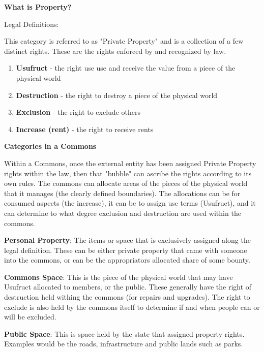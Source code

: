\documentclass{article}
\begin{document}
\pagebreak
{\huge \textbf{What is Property?}}
{\fontsize{9pt}{9pt}\selectfont
\large Legal Definitions:

This category is referred to as "Private Property" and is a collection of a few distinct rights. These are the rights enforced by and recognized by law. 

\begin{enumerate}
	
	\item \textbf{Usufruct} - the right use use and receive the value from a piece of the physical world

	\item \textbf{Destruction} - the right to destroy a piece of the physical world

	\item \textbf{Exclusion} -  the right to exclude others
 
	\item \textbf{Increase (rent)} - the right to receive rents
\end{enumerate}
	

\large \textbf{Categories in a Commons}

Within a Commons, once the external entity has been assigned Private Property rights within the law, then that "bubble" can ascribe the rights according to its own rules. The commons can allocate areas of the pieces of the physical world that it manages (the clearly defined boundaries). The allocations can be for consumed aspects (the increase), it can be to assign use terms (Usufruct), and it can determine to what degree exclusion and destruction are used within the commons.

\large \textbf{Personal Property}: The items or space that is exclusively assigned along the legal definition. These can be either private property that came with someone into the commons, or can be the appropriators allocated share of some bounty. 

 \large \textbf{Commons Space}: This is the piece of the physical world that may have Usufruct allocated to members, or the public. These generally have the right of destruction held withing the commons (for repairs and upgrades). The right to exclude is also held by the commons itself to determine if and when people can or will be excluded. 
 
  \large \textbf{Public Space}: This is space held by the state that assigned property rights. Examples would be the roads, infrastructure and public lands such as parks. 
}
\end{document}

